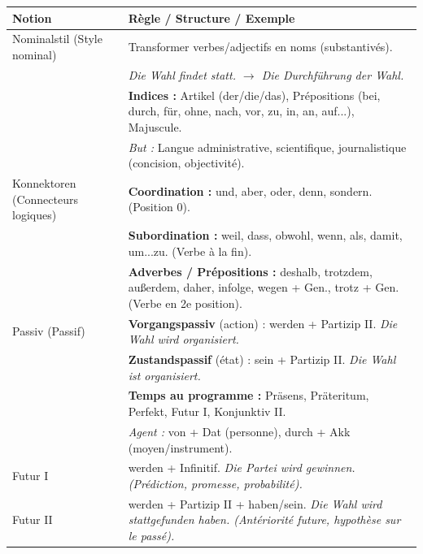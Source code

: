\documentclass[11pt]{article}
\newcommand{\cle}[1]{{\popxbold\color{popdark}#1}}
\newcounter{popsec}
\newcounter{popsub}
\newcommand{\courssub}[1]{%
  \stepcounter{popsub}%
  \par\vspace{9pt}\noindent{\popxbold\fontsize{11.5}{13}\selectfont\color{popink}{\color{poporange}\thepopsec.\thepopsub}\hspace{6pt}#1}\par\nopagebreak\vspace{4pt}
}
\newcommand{\all}[1]{\ifmmode\text{\textit{#1}}\else\begingroup\selectlanguage{ngerman}\itshape #1\endgroup\fi}
\begin{document}
\begin{center}
\begin{tabularx}{\linewidth}{|X|X|}
\hline
\rowcolor{popblueL}
\textbf{Notion} & \textbf{Règle / Structure / Exemple} \\
\hline
\cle{Nominalstil} (Style nominal) & Transformer verbes/adjectifs en noms (substantivés).\\
& \all{Die Wahl findet statt.} $\rightarrow$ \all{Die Durchführung der Wahl.} \\
& \textbf{Indices :} Artikel (der/die/das), Prépositions (bei, durch, für, ohne, nach, vor, zu, in, an, auf...), Majuscule. \\
& \textit{But :} Langue administrative, scientifique, journalistique (concision, objectivité). \\
\hline
\cle{Konnektoren} (Connecteurs logiques) & \textbf{Coordination :} und, aber, oder, denn, sondern. (Position 0).\\
& \textbf{Subordination :} weil, dass, obwohl, wenn, als, damit, um...zu. (Verbe à la fin).\\
& \textbf{Adverbes / Prépositions :} deshalb, trotzdem, außerdem, daher, infolge, wegen + Gen., trotz + Gen. (Verbe en 2e position).\\
\hline
\cle{Passiv} (Passif) & \textbf{Vorgangspassiv} (action) : werden + Partizip II. \all{Die Wahl wird organisiert.}\\
& \textbf{Zustandspassif} (état) : sein + Partizip II. \all{Die Wahl ist organisiert.}\\
& \textbf{Temps au programme :} Präsens, Präteritum, Perfekt, Futur I, Konjunktiv II.\\
& \textit{Agent :} von + Dat (personne), durch + Akk (moyen/instrument). \\
\hline
\cle{Futur I} & werden + Infinitif. \all{Die Partei wird gewinnen.} (Prédiction, promesse, probabilité).\\
\cle{Futur II} & werden + Partizip II + haben/sein. \all{Die Wahl wird stattgefunden haben.} (Antériorité future, hypothèse sur le passé). \\
\hline
\end{tabularx}
\end{center}

\vspace{0.5em}
\courssub{Méthodes express}
\end{document}
